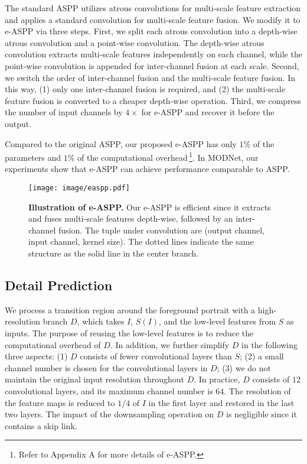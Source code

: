 \documentclass[letterpaper]{article} \usepackage{aaai22}  \usepackage{times}  \usepackage{helvet}  \usepackage{courier}  \usepackage[hyphens]{url}  \usepackage{graphicx} \urlstyle{rm} \def\UrlFont{\rm}  \usepackage{natbib}  \usepackage{caption} \usepackage{booktabs}
\begin{document}
The standard ASPP utilizes atrous convolutions for multi-scale feature extraction and applies a standard convolution for multi-scale feature fusion.
We modify it to e-ASPP via three steps. 
First, we split each atrous convolution into a depth-wise atrous convolution and a point-wise convolution. The depth-wise atrous convolution extracts multi-scale features independently on each channel, while the point-wise convolution is appended for inter-channel fusion at each scale.
Second, we switch the order of inter-channel fusion and the multi-scale feature fusion. In this way,  (1) only one inter-channel fusion is required, and (2) the multi-scale feature fusion is converted to a cheaper depth-wise operation.
Third, we compress the number of input channels by $4\times$ for e-ASPP and recover it before the output. 

Compared to the original ASPP, our proposed e-ASPP has only $1\%$ of the parameters and $1\%$ of the computational overhead\,\footnote{Refer to Appendix A for more details of e-ASPP.}. In MODNet, our experiments show that e-ASPP can achieve performance comparable to ASPP.


\begin{figure}[t]
\begin{center}
  \texttt{[image: image/easpp.pdf]}
\end{center}
  \caption{\textbf{Illustration of e-ASPP.} Our e-ASPP is efficient since it extracts and fuses multi-scale features depth-wise, followed by an inter-channel fusion. 
  The tuple under convolution are (output channel, input channel, kernel size). The dotted lines indicate the same structure as the solid line in the center branch.
  }
\label{fig:eASPP}
\end{figure}


\subsection{Detail Prediction}\label{sec:3_3}
We process a transition region around the foreground portrait with a high-resolution branch $D$, which takes $I$, $S(I)$, and the low-level features from $S$ as inputs. The purpose of reusing the low-level features is to reduce the computational overhead of $D$. In addition, we further simplify $D$ in the following three aspects: (1) $D$ consists of fewer convolutional layers than $S$; (2) a small channel number is chosen for the convolutional layers in $D$; (3) we do not maintain the original input resolution throughout $D$. In practice, $D$ consists of $12$ convolutional layers, and its maximum channel number is $64$. The resolution of the feature maps is reduced to $1/4$ of $I$ in the first layer and restored in the last two layers. 
The impact of the downsampling operation on $D$ is negligible since it contains a skip link.
\end{document}
